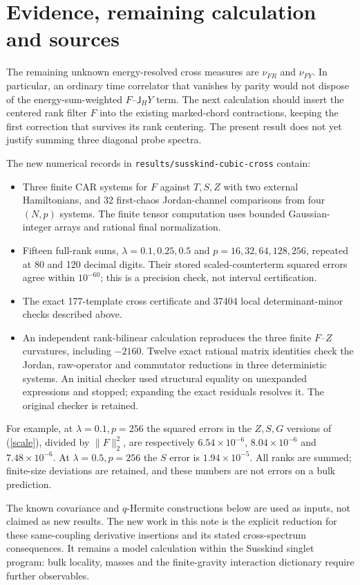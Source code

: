 \documentclass[11pt,a4paper]{article}
\newcommand{\JH}{\mathsf J_H}
\begin{document}
\newpage
\section{Evidence, remaining calculation and sources}
The remaining unknown energy-resolved cross measures are
$\nu_{FR}$ and $\nu_{FY}$. In particular, an ordinary time correlator
that vanishes by parity would not dispose of the energy-sum-weighted
$F$--$\JH Y$ term. The next calculation should insert the centered
rank filter $F$ into the existing marked-chord contractions, keeping
the first correction that survives its rank centering. The present
result does not yet justify summing three diagonal probe spectra.

The new numerical records in
\texttt{results/susskind-cubic-cross} contain:
\begin{itemize}
\item Three finite CAR systems for $F$ against $T,S,Z$ with two external
Hamiltonians, and 32 first-chaos Jordan-channel comparisons from
four $(N,p)$ systems. The finite tensor computation uses bounded
Gaussian-integer arrays and rational final normalization.
\item Fifteen full-rank sums, $\lambda=0.1,0.25,0.5$ and
$p=16,32,64,128,256$, repeated at 80 and 120 decimal digits.
Their stored scaled-counterterm squared errors agree within
$10^{-60}$; this is a precision check, not interval certification.
\item The exact 177-template cross certificate and 37404 local
determinant-minor checks described above.
\item An independent rank-bilinear calculation reproduces the three
finite $F$--$Z$ curvatures, including $-2160$. Twelve exact rational
matrix identities check the Jordan, raw-operator and commutator
reductions in three deterministic systems. An initial checker used
structural equality on unexpanded expressions and stopped; expanding
the exact residuals resolves it. The original checker is retained.
\end{itemize}
For example, at $\lambda=0.1,p=256$ the squared errors in the
$Z,S,G$ versions of (\ref{scale}), divided by $\|F\|_2^2$, are
respectively $6.54\times10^{-6}$, $8.04\times10^{-6}$ and
$7.48\times10^{-6}$. At $\lambda=0.5,p=256$ the $S$ error is
$1.94\times10^{-5}$. All ranks are summed; finite-size deviations
are retained, and these numbers are not errors on a bulk prediction.

The known covariance and $q$-Hermite constructions below are used as
inputs, not claimed as new results. The new work in this note is the
explicit reduction for these same-coupling derivative insertions and
its stated cross-spectrum consequences. It remains a model calculation
within the Susskind singlet program: bulk locality, masses and the
finite-gravity interaction dictionary require further observables.
\end{document}
